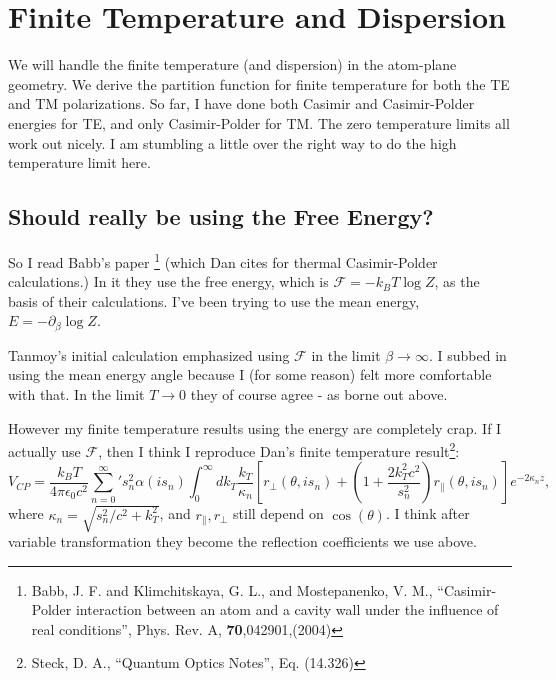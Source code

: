 \section{Finite Temperature and Dispersion}

We will handle the finite temperature (and dispersion) in the atom-plane geometry.
  We derive the partition function for finite temperature for both the TE and TM polarizations.
  So far, I have done both Casimir and Casimir-Polder energies for TE, and only Casimir-Polder for TM.
  The zero temperature limits all work out nicely.
  I am stumbling a little over the right way to do the high temperature limit here.  




\subsection{Should really be using the Free Energy?}

So I read Babb's paper \footnote{Babb, J. F. and Klimchitskaya, G. L., and Mostepanenko, V. M., 
``Casimir-Polder interaction between an atom and a cavity wall under the influence of real conditions'',
 Phys. Rev. A, \textbf{70},042901,(2004)} (which Dan cites for thermal Casimir-Polder calculations.)
  In it they use the free energy, which is $\mathcal{F} = -k_BT\log Z$, as the basis of their calculations.
  I've been trying to use the mean energy, $E= -\partial_\beta\log Z$. 

Tanmoy's initial calculation emphasized using $\mathcal{F}$ in the limit $\beta\rightarrow \infty$.
  I subbed in using the mean energy angle because I (for some reason) felt more comfortable with that.
  In the limit $T\rightarrow 0$ they of course agree - as borne out above.  

However my finite temperature results using the energy are completely crap.
If I actually use $\mathcal{F}$, then I think I reproduce Dan's  finite temperature result\footnote{Steck, D. A.,
 ``Quantum Optics Notes'', Eq. (14.326)}: 
\begin{equation}
  V_{CP} = \frac{k_BT}{4\pi\epsilon_0c^2}{\sum_{n=0}^{\infty}}'s_n^2\alpha(is_n)
\int_0^\infty dk_T \frac{k_T}{\kappa_n}\left[ r_\perp(\theta,is_n)+ 
  \left(1 +\frac{2k_T^2c^2}{s_n^2}\right)r_\|(\theta,is_n)\right]e^{-2\kappa_nz},
\end{equation}
where $\kappa_n = \sqrt{s_n^2/c^2+k_T^2}$, and $r_\|, r_\perp$ still depend on $\cos(\theta)$.
  I think after variable transformation they become the reflection coefficients we use above.  

